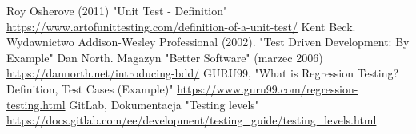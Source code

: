 \documentclass[twoside]{projektInzynierskiMS}
\begin{document}
\begin{thebibliography}{12}
 Roy Osherove (2011) "Unit Test - Definition" \url{https://www.artofunittesting.com/definition-of-a-unit-test/}
 Kent Beck. Wydawnictwo Addison-Wesley Professional (2002). "Test Driven Development: By Example"
 Dan North. Magazyn "Better Software" (marzec 2006) \url{https://dannorth.net/introducing-bdd/}
 GURU99, "What is Regression Testing? Definition, Test Cases (Example)" \url{https://www.guru99.com/regression-testing.html}
 GitLab, Dokumentacja "Testing levels" \url{https://docs.gitlab.com/ee/development/testing\_guide/testing\_levels.html}

\end{thebibliography}
\end{document}
